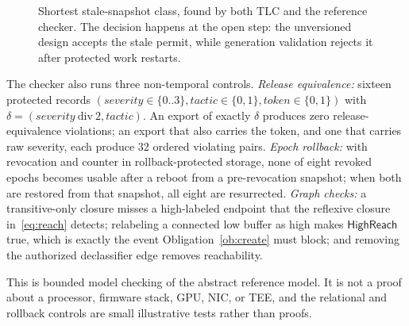 \documentclass[11pt,letterpaper]{article}
\theoremstyle{plain}
\theoremstyle{definition}
\newcommand{\HR}{\mathsf{HighReach}}
\newcommand{\Safe}{\mathsf{Safe}}
\begin{document}
\begin{figure}[t]
\centering
{}
\caption{Shortest stale-snapshot class, found by both TLC and the reference checker. The decision happens at the open step: the unversioned design accepts the stale permit, while generation validation rejects it after protected work restarts.}
\label{fig:stale}
\end{figure}

The checker also runs three non-temporal controls. \emph{Release equivalence:} sixteen protected records $(\mathit{severity} \in \{0..3\}, \mathit{tactic} \in \{0,1\}, \mathit{token} \in \{0,1\})$ with $\delta = (\mathit{severity}\ \mathrm{div}\ 2, \mathit{tactic})$. An export of exactly $\delta$ produces zero release-equivalence violations; an export that also carries the token, and one that carries raw severity, each produce 32 ordered violating pairs. \emph{Epoch rollback:} with revocation and counter in rollback-protected storage, none of eight revoked epochs becomes usable after a reboot from a pre-revocation snapshot; when both are restored from that snapshot, all eight are resurrected. \emph{Graph checks:} a transitive-only closure misses a high-labeled endpoint that the reflexive closure in~\eqref{eq:reach} detects; relabeling a connected low buffer as high makes $\HR$ true, which is exactly the event Obligation~\ref{ob:create} must block; and removing the authorized declassifier edge removes reachability.

This is bounded model checking of the abstract reference model. It is not a proof about a processor, firmware stack, GPU, NIC, or TEE, and the relational and rollback controls are small illustrative tests rather than proofs.
\end{document}

